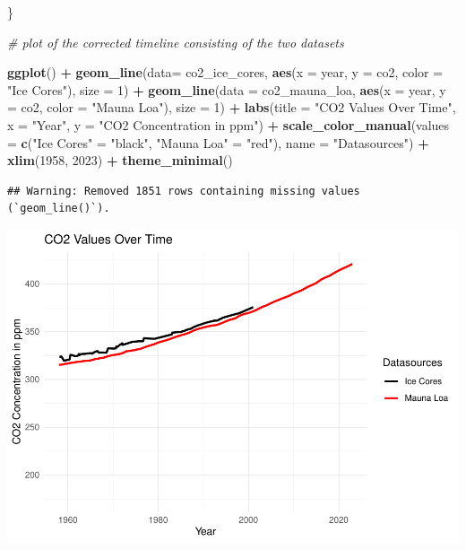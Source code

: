 \documentclass[
]{article}
\newenvironment{Shaded}{\begin{snugshade}}{\end{snugshade}}
\newcommand{\AttributeTok}[1]{\textcolor[rgb]{0.13,0.29,0.53}{#1}}
\newcommand{\CommentTok}[1]{\textcolor[rgb]{0.56,0.35,0.01}{\textit{#1}}}
\newcommand{\DecValTok}[1]{\textcolor[rgb]{0.00,0.00,0.81}{#1}}
\newcommand{\FunctionTok}[1]{\textcolor[rgb]{0.13,0.29,0.53}{\textbf{#1}}}
\newcommand{\NormalTok}[1]{#1}
\newcommand{\OtherTok}[1]{\textcolor[rgb]{0.56,0.35,0.01}{#1}}
\newcommand{\SpecialCharTok}[1]{\textcolor[rgb]{0.81,0.36,0.00}{\textbf{#1}}}
\newcommand{\StringTok}[1]{\textcolor[rgb]{0.31,0.60,0.02}{#1}}
\begin{document}
\begin{Shaded}
\begin{Highlighting}[]
\NormalTok{\} }

\CommentTok{\# plot of the corrected timeline consisting of the two datasets}

\FunctionTok{ggplot}\NormalTok{() }\SpecialCharTok{+}
  \FunctionTok{geom\_line}\NormalTok{(}\AttributeTok{data=}\NormalTok{ co2\_ice\_cores, }\FunctionTok{aes}\NormalTok{(}\AttributeTok{x =}\NormalTok{ year, }\AttributeTok{y =}\NormalTok{ co2, }\AttributeTok{color =} \StringTok{"Ice Cores"}\NormalTok{), }\AttributeTok{size =} \DecValTok{1}\NormalTok{) }\SpecialCharTok{+}
  \FunctionTok{geom\_line}\NormalTok{(}\AttributeTok{data =}\NormalTok{ co2\_mauna\_loa, }\FunctionTok{aes}\NormalTok{(}\AttributeTok{x =}\NormalTok{ year, }\AttributeTok{y =}\NormalTok{ co2, }\AttributeTok{color =} \StringTok{"Mauna Loa"}\NormalTok{), }\AttributeTok{size =} \DecValTok{1}\NormalTok{) }\SpecialCharTok{+}
  \FunctionTok{labs}\NormalTok{(}\AttributeTok{title =} \StringTok{"CO2 Values Over Time"}\NormalTok{,}
       \AttributeTok{x =} \StringTok{"Year"}\NormalTok{,}
       \AttributeTok{y =} \StringTok{"CO2 Concentration in ppm"}\NormalTok{) }\SpecialCharTok{+}
  \FunctionTok{scale\_color\_manual}\NormalTok{(}\AttributeTok{values =} \FunctionTok{c}\NormalTok{(}\StringTok{"Ice Cores"} \OtherTok{=} \StringTok{"black"}\NormalTok{, }\StringTok{"Mauna Loa"} \OtherTok{=} \StringTok{"red"}\NormalTok{),}
                     \AttributeTok{name =} \StringTok{"Datasources"}\NormalTok{) }\SpecialCharTok{+}
  \FunctionTok{xlim}\NormalTok{(}\DecValTok{1958}\NormalTok{, }\DecValTok{2023}\NormalTok{) }\SpecialCharTok{+}
  \FunctionTok{theme\_minimal}\NormalTok{()}
\end{Highlighting}
\end{Shaded}

\begin{verbatim}
## Warning: Removed 1851 rows containing missing values (`geom_line()`).
\end{verbatim}

\includegraphics{data_wrangling_files/figure-latex/unnamed-chunk-14-1.pdf}
\end{document}
